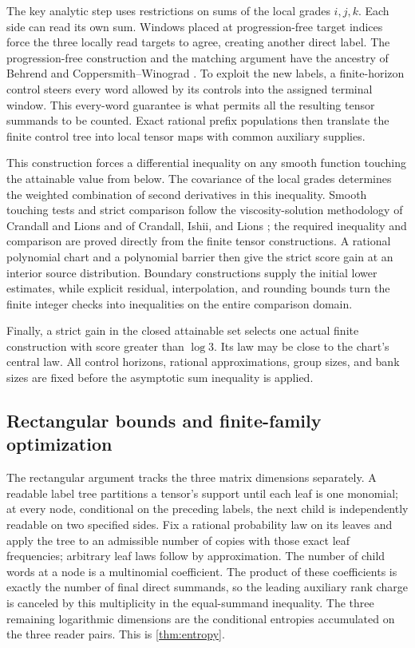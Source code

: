 \documentclass[11pt]{article}
\numberwithin{equation}{section}
\theoremstyle{definition}
\theoremstyle{remark}
\begin{document}
The key analytic step uses restrictions on sums of the local grades
\(i,j,k\).  Each side can read its own sum.  Windows placed at
progression-free target indices force the three locally read targets
to agree, creating another direct label.  The progression-free
construction and the matching argument have the ancestry of Behrend
and Coppersmith--Winograd \cite{behrend,cw}.
To exploit the new labels, a finite-horizon control steers every word
allowed by its controls into the assigned terminal window.  This
every-word guarantee is what permits all the resulting tensor
summands to be counted.  Exact rational prefix populations then
translate the finite control tree into local tensor maps with common
auxiliary supplies.

This construction forces a differential inequality on any smooth
function touching the attainable value from below.  The covariance
of the local grades determines the weighted combination of second
derivatives in this inequality.  Smooth touching
tests and strict comparison follow the viscosity-solution methodology
of Crandall and Lions and of Crandall, Ishii, and Lions
\cite{crandalllions1983,crandallishiilions1992}; the required
inequality and comparison are proved directly from the finite tensor
constructions.  A rational polynomial chart and a polynomial barrier
then give the strict score gain at an interior source distribution.
Boundary constructions supply the initial lower estimates, while
explicit residual, interpolation, and rounding bounds turn the finite
integer checks into inequalities on the entire comparison domain.

Finally, a strict gain in the closed attainable set selects one
actual finite construction with score greater than \(\log3\).
Its law may be close to the chart's central law.  All control horizons,
rational approximations, group sizes, and bank sizes are fixed before
the asymptotic sum inequality is applied.

\subsection{Rectangular bounds and finite-family optimization}

The rectangular argument tracks the three matrix dimensions separately.
A readable label tree partitions a tensor's support until each leaf
is one monomial; at every node, conditional on the preceding labels,
the next child is independently readable on two specified sides.
Fix a rational probability law on its leaves and apply the tree to
an admissible number of copies with those exact leaf frequencies;
arbitrary leaf laws follow by approximation.  The number of child words
at a node is a multinomial coefficient.  The product of these
coefficients is exactly the number of final direct summands, so the
leading auxiliary rank charge is canceled by this multiplicity in
the equal-summand inequality.  The three remaining logarithmic
dimensions are the conditional entropies accumulated on the three
reader pairs.  This is \cref{thm:entropy}.
\end{document}
